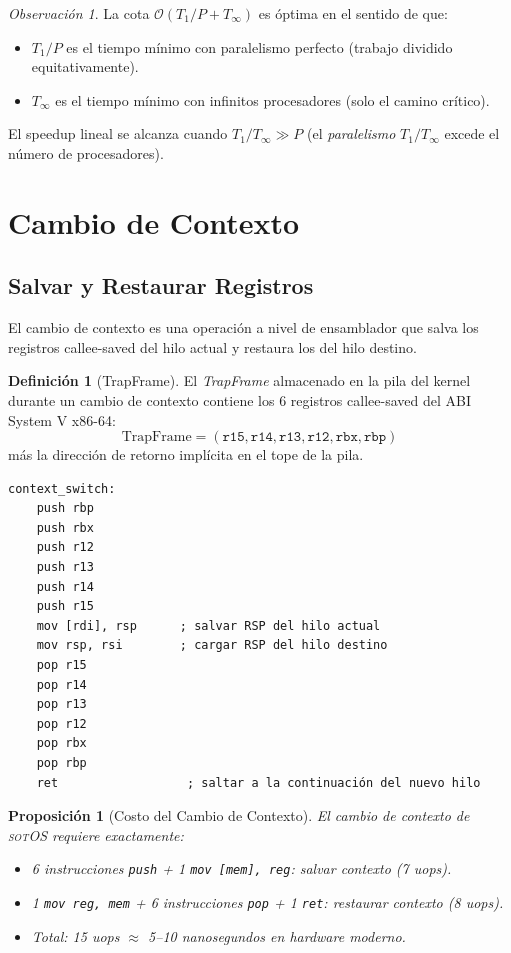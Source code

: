 \documentclass[11pt,twoside,openright]{book}
\theoremstyle{definition}
\newtheorem{definition}{Definición}[chapter]
\theoremstyle{plain}
\newtheorem{proposition}[theorem]{Proposición}
\theoremstyle{remark}
\newtheorem{remark}{Observación}[chapter]
\newcommand{\sotos}{\textsc{sotOS}}
\newcommand{\bigO}{\mathcal{O}}
\begin{document}
\begin{remark}
La cota $\bigO(T_1/P + T_\infty)$ es óptima en el sentido de que:
\begin{itemize}
    \item $T_1/P$ es el tiempo mínimo con paralelismo perfecto (trabajo dividido equitativamente).
    \item $T_\infty$ es el tiempo mínimo con infinitos procesadores (solo el camino crítico).
\end{itemize}
El speedup lineal se alcanza cuando $T_1/T_\infty \gg P$ (el \emph{paralelismo}
$T_1/T_\infty$ excede el número de procesadores).
\end{remark}

\section{Cambio de Contexto}

\subsection{Salvar y Restaurar Registros}

El cambio de contexto es una operación a nivel de ensamblador que salva los registros
callee-saved del hilo actual y restaura los del hilo destino.

\begin{definition}[TrapFrame]
\label{def:trapframe}
El \emph{TrapFrame} almacenado en la pila del kernel durante un cambio de contexto contiene
los 6 registros callee-saved del ABI System V x86-64:
\[
    \text{TrapFrame} = (\texttt{r15}, \texttt{r14}, \texttt{r13}, \texttt{r12},
                        \texttt{rbx}, \texttt{rbp})
\]
más la dirección de retorno implícita en el tope de la pila.
\end{definition}

\begin{lstlisting}[language={[x86masm]Assembler}, caption={Rutina de cambio de contexto
(\texttt{context\_switch}). RDI = puntero a RSP antiguo; RSI = RSP nuevo.},
label={lst:context-switch}]
context_switch:
    push rbp
    push rbx
    push r12
    push r13
    push r14
    push r15
    mov [rdi], rsp      ; salvar RSP del hilo actual
    mov rsp, rsi        ; cargar RSP del hilo destino
    pop r15
    pop r14
    pop r13
    pop r12
    pop rbx
    pop rbp
    ret                  ; saltar a la continuación del nuevo hilo
\end{lstlisting}

\begin{proposition}[Costo del Cambio de Contexto]
\label{prop:ctx-switch-cost}
El cambio de contexto de \sotos{} requiere exactamente:
\begin{itemize}
    \item 6 instrucciones \texttt{push} + 1 \texttt{mov [mem], reg}: salvar contexto (7 uops).
    \item 1 \texttt{mov reg, mem} + 6 instrucciones \texttt{pop} + 1 \texttt{ret}:
          restaurar contexto (8 uops).
    \item Total: 15 uops $\approx$ 5--10 nanosegundos en hardware moderno.
\end{itemize}
\end{proposition}
\end{document}
